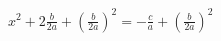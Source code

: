 \documentclass[preview]{standalone}
\begin{document}
\begin{center}
$x^2 + 2\frac{b}{2a} + \left( \frac{b}{2a} \right)^2 = - \frac{c}{a} + \left( \frac{b}{2a} \right)^2$
\end{center}
\end{document}
